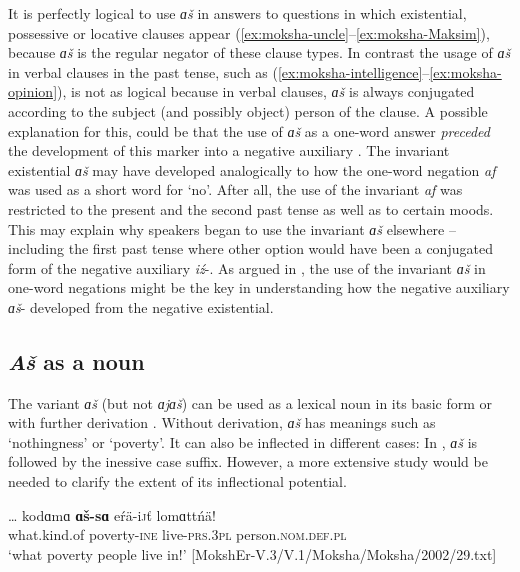 \documentclass[output=paper]{langsci/langscibook}
\begin{document}
  It is perfectly logical to use \textit{ɑš} in answers to questions in which existential, possessive or locative clauses appear (\ref{ex:moksha-uncle}--\ref{ex:moksha-Maksim}), because \textit{ɑš} is the regular negator of these clause types. In contrast the usage of \textit{ɑš} in verbal clauses in the past tense, such as (\ref{ex:moksha-intelligence}--\ref{ex:moksha-opinion}), is not as logical because in verbal clauses, \textit{ɑš} is always conjugated according to the subject (and possibly object) person of the clause. A possible explanation for this, could be that the use of \textit{ɑš} as a one-word answer \textit{preceded} the development of this marker into a negative auxiliary \citep[272--275]{Hamari2007}. The invariant existential \textit{ɑš} may have developed analogically to how the one-word negation \textit{af} was used as a short word for `no'. After all, the use of the invariant \textit{af} was restricted to the present and the second past tense as well as to certain moods. This may explain why speakers began to use the invariant \textit{ɑš} elsewhere -- including the first past tense where other option would have been a conjugated form of the negative auxiliary \textit{iź}-. As argued in , the use of the invariant \textit{ɑš} in one-word negations might be the key in understanding how the negative auxiliary \textit{ɑš}- developed from the negative existential.

\subsection{\textit{Aš} as a noun}\label{sec:2:5.5}

The variant \textit{ɑš} (but not \textit{ɑjɑš}) can be used as a lexical noun in its basic form or with further derivation \citep[268--270]{Hamari2007}. Without derivation, \textit{ɑš} has meanings such as `nothingness' or `poverty'. It can also be inflected in different cases: In , \textit{ɑš} is followed by the inessive case suffix. However, a more extensive study would be needed to clarify the extent of its inflectional potential. 

\ea\label{ex:moksha-poverty}
\gll \ob\ldots\cb{} kodɑmɑ \textbf{ɑš-sɑ} eŕä-i\textsc{j}ť lomɑttńä!\\
{} what.kind.of poverty-\textsc{ine} live-\textsc{prs.3pl} person.\textsc{nom.def.pl}\\
\glt `what poverty people live in!' [MokshEr-V.3/V.1/Moksha/Moksha/2002/29.txt]
\z
\end{document}
